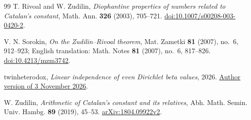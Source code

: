 \begin{thebibliography}{99}
T. Rivoal and W. Zudilin,
\emph{Diophantine properties of numbers related to Catalan's constant},
Math. Ann. \textbf{326} (2003), 705--721.
\href{https://doi.org/10.1007/s00208-003-0420-2}
{doi:10.1007/s00208-003-0420-2}.

V. N. Sorokin,
\emph{On the Zudilin--Rivoal theorem},
Mat. Zametki \textbf{81} (2007), no.~6, 912--923;
English translation: Math. Notes \textbf{81} (2007), no.~6, 817--826.
\href{https://doi.org/10.4213/mzm3742}{doi:10.4213/mzm3742}.

twinheterodox,
\emph{Linear independence of even Dirichlet beta values},
2026.
\href{https://github.com/twinheterodox/beta4/blob/095d309ae168757dbfa4063484d28186f7f41beb/even-beta-independence/output/pdf/even-beta-independence.pdf}
{Author version of 3 November 2026}.

W. Zudilin,
\emph{Arithmetic of Catalan's constant and its relatives},
Abh. Math. Semin. Univ. Hambg. \textbf{89} (2019), 45--53.
\href{https://arxiv.org/abs/1804.09922v2}{arXiv:1804.09922v2}.

\end{thebibliography}

